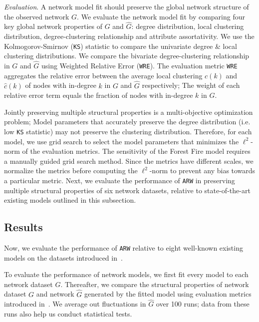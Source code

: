 \textit{Evaluation}.
A network model fit should
preserve the global network structure of the observed network $G$.
We evaluate
the network model fit by comparing four key global network properties of ${G}$ and $\hat{G}$:
degree distribution, local clustering distribution, degree-clustering relationship
and attribute assortativity.
We use the Kolmogorov-Smirnov (\texttt{KS}) statistic to compare the univariate degree
\& local clustering distributions.
We compare the bivariate degree-clustering relationship in $G$ and $\hat{G}$ using
Weighted Relative Error (\texttt{WRE}). The evaluation metric \texttt{WRE} aggregates the relative error
between the average local clustering $c(k)$ and $\hat{c}(k)$ of nodes  with in-degree $k$
in $G$ and $\hat{G}$ respectively; The weight of each relative error term equals the fraction
of nodes with in-degree $k$ in $G$.

Jointly preserving multiple structural properties is a multi-objective optimization
problem; Model parameters that accurately preserve the degree distribution
(i.e. low \texttt{KS} statistic) may not preserve the clustering distribution.
Therefore, for each model, we use grid search to select the model parameters
that minimizes the $\ell^2$-norm of the evaluation metrics. The sensitivity of the
Forest Fire model requires a manually guided grid search method. Since the metrics have
different scales, we normalize the metrics before computing the $\ell^2$-norm
to prevent any bias towards a particular metric.
Next, we evaluate the performance of \texttt{ARW} in preserving multiple structural
properties of six network datasets, relative to state-of-the-art existing models outlined
in this subsection.

\subsection{Results}
\label{sub:Experimental Results}

Now, we evaluate the performance of \texttt{ARW} relative to eight well-known
existing models on the datasets introduced in~.

To evaluate the performance of network models, we first fit every model
to each network dataset $G$. Thereafter, we compare the structural properties of
network dataset $G$ and network $\hat{G}$ generated by the fitted model using
evaluation metrics introduced in~. We average out
fluctuations in $\hat{G}$ over 100 runs; data from these runs also help us conduct statistical tests.

